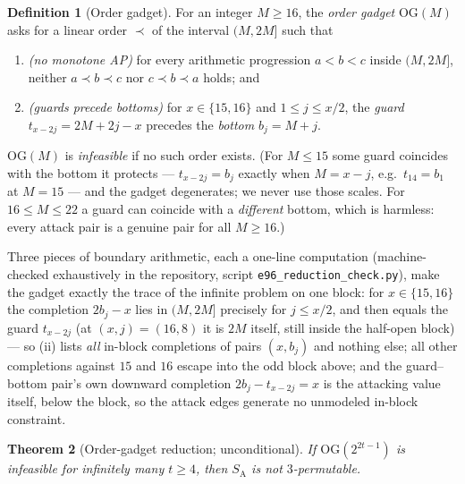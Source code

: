 \documentclass[11pt]{article}
\newtheorem{theorem}{Theorem}
\theoremstyle{definition}
\newtheorem{definition}[theorem]{Definition}
\newcommand{\SA}{S_{\mathrm{A}}}
\newcommand{\OG}{\mathrm{OG}}
\begin{document}
\begin{definition}[Order gadget]\label{def:og}
For an integer $M \ge 16$, the \emph{order gadget} $\OG(M)$ asks for a
linear order $\prec$ of the interval $(M, 2M]$ such that
\begin{enumerate}
\item[(i)] \emph{(no monotone AP)} for every arithmetic progression
$a < b < c$ inside $(M, 2M]$, neither $a \prec b \prec c$ nor
$c \prec b \prec a$ holds; and
\item[(ii)] \emph{(guards precede bottoms)} for $x \in \{15, 16\}$ and
$1 \le j \le x/2$, the \emph{guard} $t_{x-2j} = 2M + 2j - x$ precedes
the \emph{bottom} $b_j = M + j$.
\end{enumerate}
$\OG(M)$ is \emph{infeasible} if no such order exists. (For $M \le 15$
some guard coincides with the bottom it protects --- $t_{x-2j} = b_j$
exactly when $M = x - j$, e.g.\ $t_{14} = b_1$ at $M = 15$ --- and the
gadget degenerates; we never use those scales. For $16 \le M \le 22$ a
guard can coincide with a \emph{different} bottom, which is harmless:
every attack pair is a genuine pair for all $M \ge 16$.)
\end{definition}

Three pieces of boundary arithmetic, each a one-line computation
(machine-checked exhaustively in the repository, script
\texttt{e96\_reduction\_check.py}), make the gadget exactly the trace of
the infinite problem on one block: for $x \in \{15,16\}$ the completion
$2b_j - x$ lies in $(M, 2M]$ precisely for $j \le x/2$, and then equals
the guard $t_{x-2j}$ (at $(x, j) = (16, 8)$ it is $2M$ itself, still
inside the half-open block) --- so (ii) lists \emph{all} in-block
completions of pairs $(x, b_j)$ and nothing else; all other completions
against $15$ and $16$ escape into the odd block above; and the
guard--bottom pair's own downward completion $2b_j - t_{x-2j} = x$ is the
attacking value itself, below the block, so the attack edges generate no
unmodeled in-block constraint.

\begin{theorem}[Order-gadget reduction; unconditional]\label{thm:ogred}
If $\OG(2^{2t-1})$ is infeasible for infinitely many $t \ge 4$, then
$\SA$ is not $3$-permutable.
\end{theorem}
\end{document}
